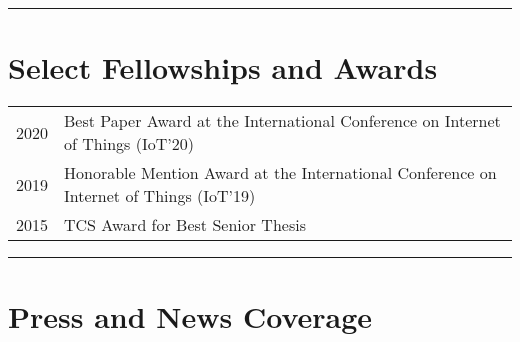 \documentclass[letterpaper,10pt]{article}
\begin{document}
\hrule

\vspace{0.5cm}

  \section*{\color{dartmouthgreen} Select Fellowships and Awards}

  \begin{tabular}{r l}
\setlength\itemsep{0ex}
2020 &  Best Paper Award at the International Conference on Internet of Things (IoT'20) \\
2019 &  Honorable Mention Award at the International Conference on Internet of Things (IoT'19)\\
2015 & TCS Award for Best Senior Thesis\\
  \end{tabular}

\vspace{0.5cm}
\hrule



  \section*{\color{dartmouthgreen} Press and News Coverage}
\end{document}
